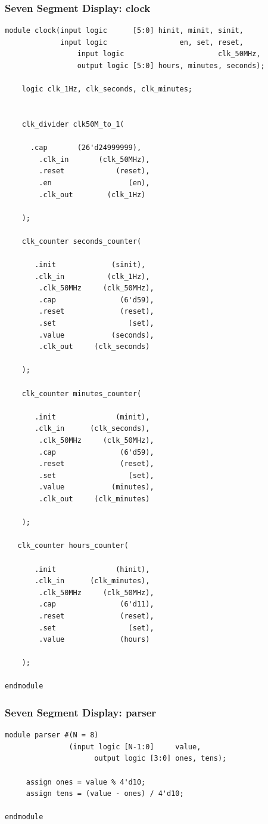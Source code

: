 \documentclass[a4paper]{article}
\begin{document}
\subsubsection{Seven Segment Display: clock}
\begin{Verbatim}
module clock(input logic      [5:0] hinit, minit, sinit,
             input logic                 en, set, reset,
				 input logic                      clk_50MHz,
				 output logic [5:0] hours, minutes, seconds);
   
	logic clk_1Hz, clk_seconds, clk_minutes;
	
	
	clk_divider clk50M_to_1(
	
      .cap       (26'd24999999),
		.clk_in       (clk_50MHz),
		.reset            (reset),
		.en                  (en),
		.clk_out        (clk_1Hz)
	
	);
	
	clk_counter seconds_counter(
	
	   .init             (sinit),
	   .clk_in          (clk_1Hz),
		.clk_50MHz     (clk_50MHz),
		.cap               (6'd59),
		.reset             (reset),
		.set                 (set),
		.value           (seconds),
		.clk_out     (clk_seconds)
	
	);
	
	clk_counter minutes_counter(
	
	   .init              (minit),
	   .clk_in      (clk_seconds),
		.clk_50MHz     (clk_50MHz),
		.cap               (6'd59),
		.reset             (reset),
		.set                 (set),
		.value           (minutes),
		.clk_out     (clk_minutes)
	
	);

   clk_counter hours_counter(
	
	   .init              (hinit),
	   .clk_in      (clk_minutes),
		.clk_50MHz     (clk_50MHz),
		.cap               (6'd11),
		.reset             (reset),
		.set                 (set),
		.value             (hours)
	
	);

endmodule 
\end{Verbatim}

\subsubsection{Seven Segment Display: parser}
\begin{Verbatim}
module parser #(N = 8)
               (input logic [N-1:0]     value,
					 output logic [3:0] ones, tens);
	
	 assign ones = value % 4'd10;				
	 assign tens = (value - ones) / 4'd10;
					
endmodule 
\end{Verbatim}
\end{document}
